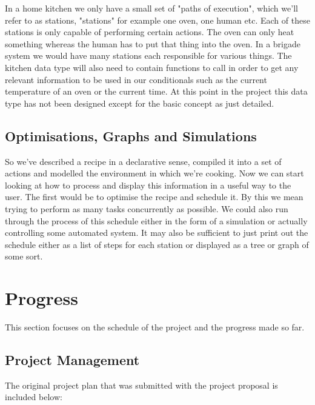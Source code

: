 \documentclass[11pt]{article}
\begin{document}
    In a home kitchen we only have a small set of "paths of execution", which we'll refer to as stations,
    "stations" for example one oven, one human etc. Each of these stations is only capable of performing
    certain actions. The oven can only heat something whereas the human has to put that thing into the oven.
    In a brigade system we would have many stations each responsible for various things. The kitchen data
    type will also need to contain functions to call in order to get any relevant information to be used
    in our conditionals such as the current temperature of an oven or the current time. At this point in
    the project this data type has not been designed except for the basic concept as just detailed.

    \subsection{Optimisations, Graphs and Simulations}

    So we've described a recipe in a declarative sense, compiled it into a set of actions and modelled
    the environment in which we're cooking. Now we can start looking at how to process and display this
    information in a useful way to the user. The first would be to optimise the recipe and schedule it.
    By this we mean trying to perform as many tasks concurrently as possible. We could also run through
    the process of this schedule either in the form of a simulation or actually controlling some automated
    system. It may also be sufficient to just print out the schedule either as a list of steps for each
    station or displayed as a tree or graph of some sort.

    \section{Progress}

    This section focuses on the schedule of the project and the progress made so far.
    
    \subsection{Project Management}

    The original project plan that was submitted with the project proposal is included below:
\end{document}
